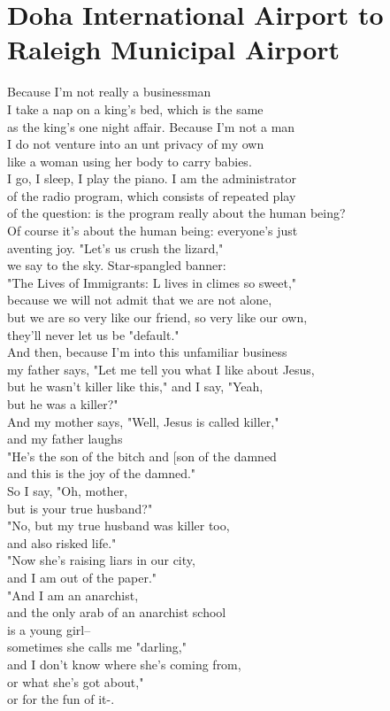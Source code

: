 \documentclass[smalldemyvopaper,11pt,twoside,onecolumn,openright,extrafontsizes]{memoir}
\begin{document}
\chapter{Doha International Airport to Raleigh Municipal Airport}
Because I'm not really a businessman
\\I take a nap on a king's bed, which is the same
\\as the king's one night affair. Because I'm not a man
\\I do not venture into an unt privacy of my own
\\like a woman using her body to carry babies.
\\I go, I sleep, I play the piano. I am the administrator
\\of the radio program, which consists of repeated play
\\of the question: is the program really about the human being?
\\Of course it's about the human being: everyone's just
\\aventing joy. "Let's us crush the lizard,"
\\we say to the sky. Star-spangled banner:
\\"The Lives of Immigrants: L lives in climes so sweet,"
\\because we will not admit that we are not alone,
\\but we are so very like our friend, so very like our own,
\\they'll never let us be "default."
\\And then, because I'm into this unfamiliar business
\\my father says, "Let me tell you what I like about Jesus,
\\but he wasn't killer like this," and I say, "Yeah,
\\but he was a killer?"
\\And my mother says, "Well, Jesus is called killer,"
\\and my father laughs
\\"He's the son of the bitch and [son of the damned
\\and this is the joy of the damned."
\\So I say, "Oh, mother,
\\but is your true husband?"
\\"No, but my true husband was killer too,
\\and also risked life."
\\"Now she's raising liars in our city,
\\and I am out of the paper."
\\"And I am an anarchist,
\\and the only arab of an anarchist school
\\is a young girl--
\\sometimes she calls me "darling,"
\\and I don't know where she's coming from,
\\or what she's got about,"
\\or for the fun of it-.
\end{document}
